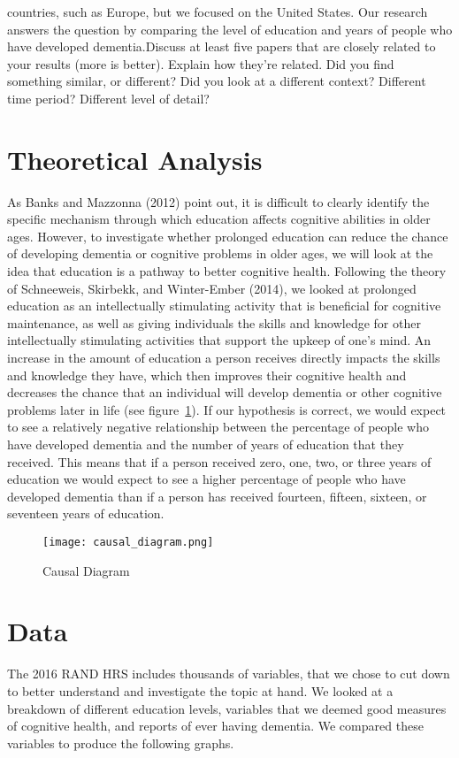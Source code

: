 \documentclass{article}
\begin{document}
countries, such as Europe, but we focused on the United States. Our research answers the question by comparing the level of education and years of people who have developed dementia.Discuss at least five papers that are closely related to your results (more is better). Explain how they're related. Did you find something similar, or different? Did you look at a different context? Different time period? Different level of detail?

\section{Theoretical Analysis} \label{sec:theory}
\hspace*{1em} As Banks and Mazzonna (2012) point out, it is difficult to clearly identify the specific mechanism through which education affects cognitive abilities in older ages. However, to investigate whether prolonged education can reduce the chance of developing dementia or cognitive problems in older ages, we will look at the idea that education is a pathway to better cognitive health. Following the theory of Schneeweis, Skirbekk, and Winter-Ember (2014), we looked at prolonged education as an intellectually stimulating activity that is beneficial for cognitive maintenance, as well as giving individuals the skills and knowledge for other intellectually stimulating activities that support the upkeep of one’s mind. An increase in the amount of education a person receives directly impacts the skills and knowledge they have, which then improves their cognitive health and decreases the chance that an individual will develop dementia or other cognitive problems later in life (see figure~\ref{fig:causal diagram}). If our hypothesis is correct, we would expect to see a relatively negative relationship between the percentage of people who have developed dementia and the number of years of education that they received. This means that if a person received zero, one, two, or three years of education we would expect to see a higher percentage of people who have developed dementia than if a person has received fourteen, fifteen, sixteen, or seventeen years of education. 

\begin{figure}[h!]
    \centering
    \texttt{[image: causal\_diagram.png]}
    \caption{Causal Diagram}
    \label{fig:causal diagram}
\end{figure}

\section{Data}
\label{sec:data}
\hspace*{1em}The 2016 RAND HRS includes thousands of variables, that we chose to cut down to better understand and investigate the topic at hand. We looked at a breakdown of different education levels, variables that we deemed good measures of cognitive health, and reports of ever having dementia. We compared these variables to produce the following graphs.
\end{document}
